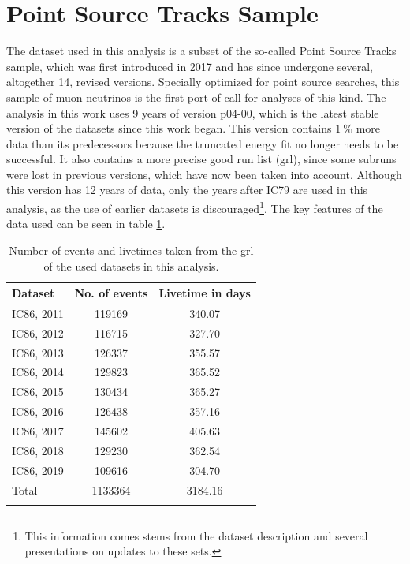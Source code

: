 \section{Point Source Tracks Sample} \label{sec:data}
%
%
%

The dataset used in this analysis is a subset of the so-called Point Source Tracks sample, which was first introduced in 2017 and has since undergone several, altogether 14, revised versions.
Specially optimized for point source searches, this sample of muon neutrinos is the first port of call for analyses of this kind.
The analysis in this work uses 9 years of version p04-00, which is the latest stable version of the datasets since this work began.
This version contains $\SI{1}{\percent}$ more data than its predecessors because the truncated energy fit no longer needs to be successful.
It also contains a more precise good run list (grl), since some subruns were lost in previous versions, which have now been taken into account.
Although this version has 12 years of data, only the years after IC79 are used in this analysis, as the use of earlier datasets is discouraged\footnote{This information comes stems from the dataset description and several presentations on updates to these sets.}.
The key features of the data used can be seen in table \ref{tab:data}.

\begin{table}
  \centering
  \caption{Number of events and livetimes taken from the grl of the used datasets in this analysis.}
  \begin{tabular}{lcc}
    \toprule
    Dataset & No. of events & Livetime in days \\
    \toprule
    IC86, 2011 & 119169 & 340.07 \\
    IC86, 2012 & 116715 & 327.70 \\
    IC86, 2013 & 126337 & 355.57 \\
    IC86, 2014 & 129823 & 365.52 \\
    IC86, 2015 & 130434 & 365.27 \\
    IC86, 2016 & 126438 & 357.16 \\
    IC86, 2017 & 145602 & 405.63 \\
    IC86, 2018 & 129230 & 362.54 \\
    IC86, 2019 & 109616 & 304.70 \\
    \hline
    Total & 1133364 & 3184.16 \\
    \toprule
    \label{tab:data}
  \end{tabular}
\end{table}

